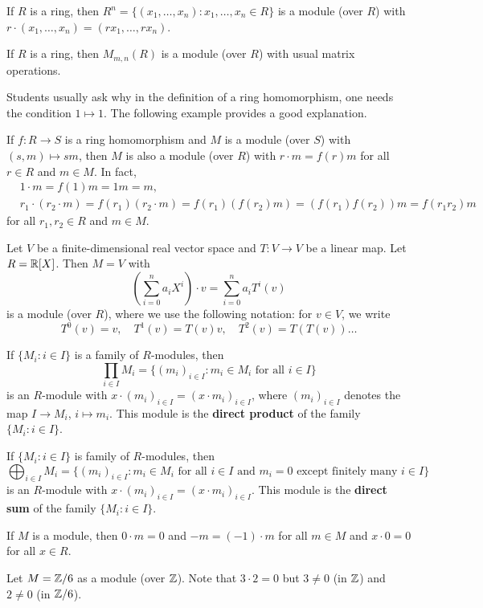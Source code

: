 \begin{example}
If $R$ is a ring, then $R^n=\{(x_1,\dots,x_n):x_1,\dots,x_n\in R\}$ 
is a module (over $R$) with  
$r\cdot (x_1,\dots,x_n)=(rx_1,\dots,rx_n)$. 
\end{example}

\begin{example}
If $R$ is a ring, then $M_{m,n}(R)$ is a module (over $R$) with usual matrix operations. 
\end{example}

Students usually ask why in the definition of a ring homomorphism, one needs
the condition $1\mapsto 1$. The following example provides a good explanation. 

\begin{example}
If $f\colon R\to S$ is a ring homomorphism and $M$ is a module (over $S$) with 
$(s,m)\mapsto sm$, then 
$M$ is also a module (over $R$) with $r\cdot m=f(r)m$ for all $r\in R$ and $m\in M$. In fact, 
\begin{align*}
&1\cdot m=f(1)m=1m=m,\\
&r_1\cdot (r_2\cdot m)=f(r_1)(r_2\cdot m)=f(r_1)(f(r_2)m)=(f(r_1)f(r_2))m=f(r_1r_2)m
\end{align*}
for all $r_1,r_2\in R$ and $m\in M$.	  	
\end{example}
%
\begin{example}
Let $V$ be a finite-dimensional real vector space and $T\colon V\to V$ be a linear map.  
Let $R=\mathbb{R}[X]$. Then $M=V$ with 
\[
\left(\sum_{i=0}^na_iX^i\right)\cdot v=\sum_{i=0}^na_iT^i(v)
\]	
is a module (over $R$), where we use the following notation: for $v\in V$, we write 
\[
    T^0(v)=v,\quad 
    T^1(v)=T(v)v,\quad 
    T^2(v)=T(T(v))\dots 
\]
\end{example}

\begin{example}
If $\{M_i:i\in I\}$ is a family of $R$-modules, then  	
\[
\prod_{i\in I}M_i=\{(m_i)_{i\in I}:m_i\in M_i\text{ for all $i\in I$}\}
\]
is an $R$-module with 
$x\cdot (m_i)_{i\in I}=(x\cdot m_i)_{i\in I}$, 
where $(m_i)_{i\in I}$ denotes the map $I\to M_i$, $i\mapsto m_i$.
This module is the \textbf{direct product} of the family $\{M_i:i\in I\}$.
\end{example}
%
\begin{example}
If $\{M_i:i\in I\}$ is family of $R$-modules, then   	
\[
\bigoplus_{i\in I}M_i=\{(m_i)_{i\in I}:m_i\in M_i\text{ for all $i\in I$ and $m_i=0$ except finitely many $i\in I$}\}
\]
is an $R$-module with 
$x\cdot (m_i)_{i\in I}=(x\cdot m_i)_{i\in I}$. 
This module is the \textbf{direct sum} of the family $\{M_i:i\in I\}$. 
\end{example}
%
If $M$ is a module, then $0\cdot m=0$ and $-m=(-1)\cdot m$ for all $m\in M$ and 
$x\cdot 0=0$ for all $x\in R$. 
%
\begin{example}
Let $M=\mathbb{Z}/6$ as a module (over $\mathbb{Z}$). Note that 
$3\cdot 2=0$ but $3\ne 0$ (in $\mathbb{Z}$) and $2\ne 0$ (in $\mathbb{Z}/6$).  
\end{example}

